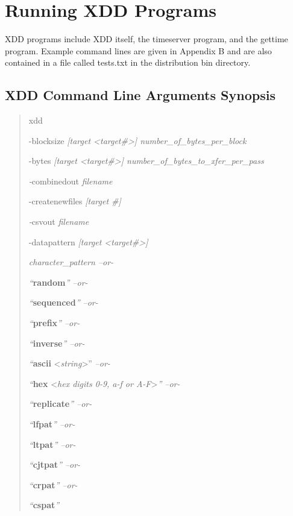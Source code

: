 \newpage
\section{Running XDD Programs}\label{running-xdd-programs}

XDD programs include XDD itself, the timeserver program, and the gettime program. Example command lines are given in Appendix B and are also contained in a file called tests.txt in the distribution bin directory.

\subsection{XDD Command Line Arguments Synopsis}\label{xdd-command-line-arguments-synopsis}

\begin{quote}
xdd

-blocksize \emph{{[}target \textless target\#\textgreater{]} number\_of\_bytes\_per\_block}

-bytes \emph{{[}target \textless target\#\textgreater{]} number\_of\_bytes\_to\_xfer\_per\_pass}

\emph{-}combinedout \emph{filename}

-createnewfiles \emph{{[}target \#{]}}

\emph{-}csvout \emph{filename}

-datapattern \emph{{[}target \textless target\#\textgreater{]}}

\emph{character\_pattern --or-}

\emph{``}\textbf{random}\emph{'' --or-}

\emph{``}\textbf{sequenced}\emph{'' --or-}

\emph{``}\textbf{prefix}\emph{'' --or-}

\emph{``}\textbf{inverse}\emph{'' --or-}

\emph{``}\textbf{ascii} \textless{}\emph{string}\textgreater'' \emph{--or-}

\emph{``}\textbf{hex} \textless{}\emph{hex digits 0-9, a-f or A-F}\textgreater{}\emph{'' --or-}

\emph{``}\textbf{replicate}\emph{'' --or-}

\emph{``}\textbf{lfpat}\emph{'' --or-}

\emph{``}\textbf{ltpat}\emph{'' --or-}

\emph{``}\textbf{cjtpat}\emph{'' --or-}

\emph{``}\textbf{crpat}\emph{'' --or-}

\emph{``}\textbf{cspat}\emph{''}


\end{quote}
